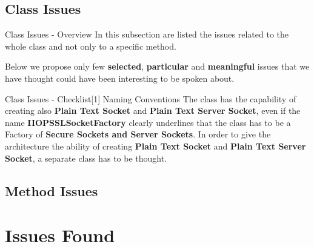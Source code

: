 \documentclass{../common/latex_classes/pdf_presentation}
\begin{document}
	\subsection{Class Issues}
	
	\begin{frame}{Class Issues - Overview}
		In this subsection are listed the issues related to the whole class and not only to a specific method. \par Below we propose only few \textbf{selected}, \textbf{particular} and \textbf{meaningful} issues that we have thought could have been interesting to be spoken about.
	\end{frame}
	\begin{frame}{Class Issues - Checklist[1] Naming Conventions}
		The class has the capability of creating also \textbf{Plain Text Socket} and \textbf{Plain Text Server Socket}, even if the name \textbf{IIOPSSLSocketFactory} clearly underlines that the class has to be a Factory of \textbf{Secure Sockets and Server Sockets}. In order to give the architecture the ability of creating \textbf{Plain Text Socket} and \textbf{Plain Text Server Socket}, a separate class has to be thought.
	\end{frame}
	
	\subsection{Method Issues}
	
	\section{Issues Found}
	
\end{document}
